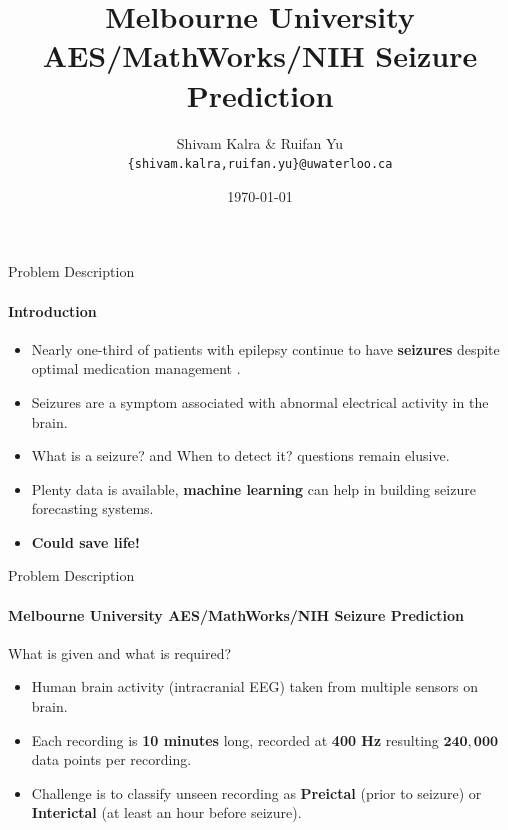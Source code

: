 \documentclass{beamer}
\title{Melbourne University AES/MathWorks/NIH Seizure Prediction}
\subtitle{}
\date{\today}
\author{Shivam Kalra \& Ruifan Yu \\ \texttt{\{shivam.kalra,ruifan.yu\}@uwaterloo.ca}}
\institute{}
\begin{document}
\maketitle

\begin{frame}{Problem Description}
  \framesubtitle{Introduction}

  \begin{itemize}
  \item
    Nearly one-third of patients with epilepsy continue to have \textbf{seizures} despite
    optimal medication management \cite{ramgopal_seizure_2014}.

  \item
    Seizures are a symptom associated with abnormal electrical activity in the
    brain.

  \item
    \alert{What is a seizure?} and \alert{When to detect it?} questions remain
    elusive.

  \item
    Plenty data is available, \textbf{machine learning} can help in building
    seizure forecasting systems.

  \item
     \textbf{Could save life!}
    
  \end{itemize}

\end{frame}

\begin{frame}{Problem Description}
  \framesubtitle{Melbourne University AES/MathWorks/NIH Seizure Prediction}
  \begin{block}{What is given and what is required?}
    \begin{itemize}
    \item
      Human brain activity (intracranial EEG) taken from multiple sensors on
      brain.

    \item
      Each recording is \textbf{10 minutes} long, recorded at \textbf{400 Hz}
      resulting $\boldsymbol{240,000}$ data points per recording.

    \item
      Challenge is to classify unseen recording as \textbf{Preictal}
      (prior to seizure) or \textbf{Interictal} (at least an hour before
      seizure).
    \end{itemize}
  \end{block}
    
\end{frame}
\end{document}
